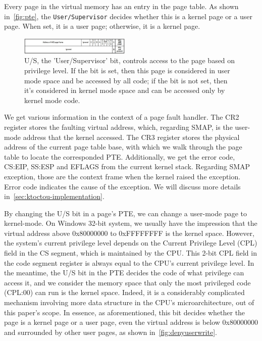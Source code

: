 Every page in the virtual memory has an entry in the page table. As shown in~\autoref{fig:pte}, the \texttt{User/Supervisor} decides whether this is a kernel page or a user page. When set, it is a user page; otherwise, it is a kernel page.

\begin{figure}[th]
  \includegraphics[width=0.47\textwidth]{figures/pte2}
  \centering
  \caption{U/S, the 'User/Supervisor' bit, controls access to the page based on privilege level. If the bit is set, then this page is considered in user mode space and be accessed by all code; if the bit is not set, then it's considered in kernel mode space and can be accessed only by kernel mode code. }
  \label{fig:pte}
\end{figure}



We get various information in the context of a page fault handler. The CR2 register stores the faulting virtual address, which, regarding SMAP, is the user-mode address that the kernel accessed. The CR3 register stores the physical address of the current page table base, with which we walk through the page table to locate the corresponded PTE. Additionally, we get the error code, CS:EIP, SS:ESP and EFLAGS from the  current kernel stack. Regarding SMAP exception, those are the context frame when the kernel raised the exception. Error code indicates the cause of the exception. We will discuss more details in~\autoref{sec:ktoctou-implementation}.



By changing the U/S bit in a page's PTE, we can change a user-mode page to kernel-mode. On Windows 32-bit system, we usually have the impression that the virtual address above 0x80000000 to 0xFFFFFFFF is the kernel space. However, the system's current privilege level depends on the Current Privilege Level (CPL) field in the CS segment, which is maintained by the CPU. This 2-bit CPL field in the code segment register is always equal to the CPU's current privilege level. In the meantime, the U/S bit in the PTE decides the code of what privilege can access it, and we consider the memory space that only the most privileged code (CPL:00) can run is the kernel space. Indeed, it is a considerably complicated mechanism involving more data structure in the CPU's microarchitecture, out of this paper's scope. In essence, as aforementioned, this bit decides whether the page is a kernel page or a user page, even the virtual address is below 0x80000000 and surrounded by other user pages, as shown in~\autoref{fig:denyuserwrite}.

